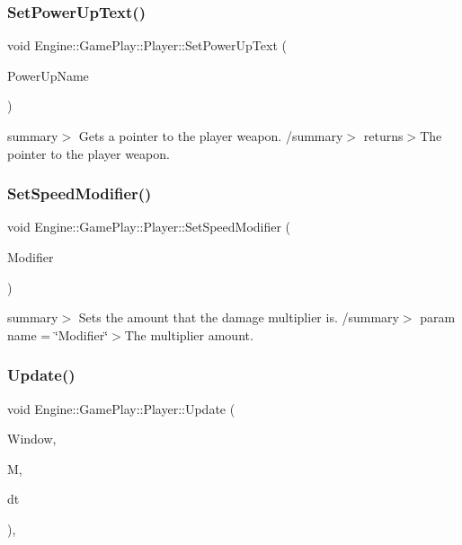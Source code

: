 \subsubsection{\texorpdfstring{Set\+Power\+Up\+Text()}{SetPowerUpText()}}
{\footnotesize\ttfamily void Engine\+::\+Game\+Play\+::\+Player\+::\+Set\+Power\+Up\+Text (\begin{DoxyParamCaption}\item[{string}]{Power\+Up\+Name }\end{DoxyParamCaption})}

summary$>$ Gets a pointer to the player weapon. /summary$>$ returns$>$The pointer to the player weapon.\mbox{\label{class_engine_1_1_game_play_1_1_player_a5a67ed64c644e9ebea338feb0db0ac98}} 
\subsubsection{\texorpdfstring{Set\+Speed\+Modifier()}{SetSpeedModifier()}}
{\footnotesize\ttfamily void Engine\+::\+Game\+Play\+::\+Player\+::\+Set\+Speed\+Modifier (\begin{DoxyParamCaption}\item[{float}]{Modifier }\end{DoxyParamCaption})}

summary$>$ Sets the amount that the damage multiplier is. /summary$>$ param name = \char`\"{}\+Modifier\char`\"{}$>$The multiplier amount.\mbox{\label{class_engine_1_1_game_play_1_1_player_a06c682bf13c20fb2390807ec681b0121}} 
\subsubsection{\texorpdfstring{Update()}{Update()}}
{\footnotesize\ttfamily void Engine\+::\+Game\+Play\+::\+Player\+::\+Update (\begin{DoxyParamCaption}\item[{Render\+Window $\ast$}]{Window,  }\item[{\hyperlink{class_engine_1_1_core_1_1_map}{Map}}]{M,  }\item[{float}]{dt }\end{DoxyParamCaption})\hspace{0.3cm}{\ttfamily [override]}, {\ttfamily [virtual]}}

